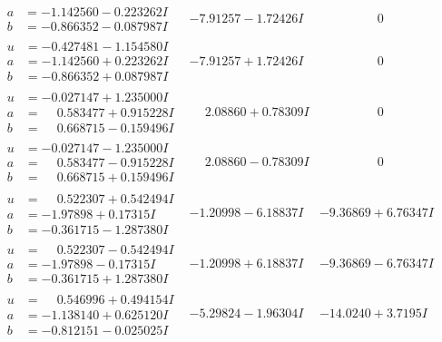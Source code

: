 \documentclass[1p]{elsarticle_modified}
\theoremstyle{definition}
\begin{document}
$$\begin{array}{c|c|c}
\begin{aligned}
a &= -1.142560 - 0.223262 I \\
b &= -0.866352 - 0.087987 I\end{aligned}
 & -7.91257 - 1.72426 I & \phantom{-0.000000 } 0 \\ \hline\begin{aligned}
u &= -0.427481 - 1.154580 I \\
a &= -1.142560 + 0.223262 I \\
b &= -0.866352 + 0.087987 I\end{aligned}
 & -7.91257 + 1.72426 I & \phantom{-0.000000 } 0 \\ \hline\begin{aligned}
u &= -0.027147 + 1.235000 I \\
a &= \phantom{-}0.583477 + 0.915228 I \\
b &= \phantom{-}0.668715 - 0.159496 I\end{aligned}
 & \phantom{-}2.08860 + 0.78309 I & \phantom{-0.000000 } 0 \\ \hline\begin{aligned}
u &= -0.027147 - 1.235000 I \\
a &= \phantom{-}0.583477 - 0.915228 I \\
b &= \phantom{-}0.668715 + 0.159496 I\end{aligned}
 & \phantom{-}2.08860 - 0.78309 I & \phantom{-0.000000 } 0 \\ \hline\begin{aligned}
u &= \phantom{-}0.522307 + 0.542494 I \\
a &= -1.97898 + 0.17315 I \\
b &= -0.361715 - 1.287380 I\end{aligned}
 & -1.20998 - 6.18837 I & -9.36869 + 6.76347 I \\ \hline\begin{aligned}
u &= \phantom{-}0.522307 - 0.542494 I \\
a &= -1.97898 - 0.17315 I \\
b &= -0.361715 + 1.287380 I\end{aligned}
 & -1.20998 + 6.18837 I & -9.36869 - 6.76347 I \\ \hline\begin{aligned}
u &= \phantom{-}0.546996 + 0.494154 I \\
a &= -1.138140 + 0.625120 I \\
b &= -0.812151 - 0.025025 I\end{aligned}
 & -5.29824 - 1.96304 I & -14.0240 + 3.7195 I \\ \hline\begin{aligned}

\end{aligned}
\end{array}$$
\end{document}
